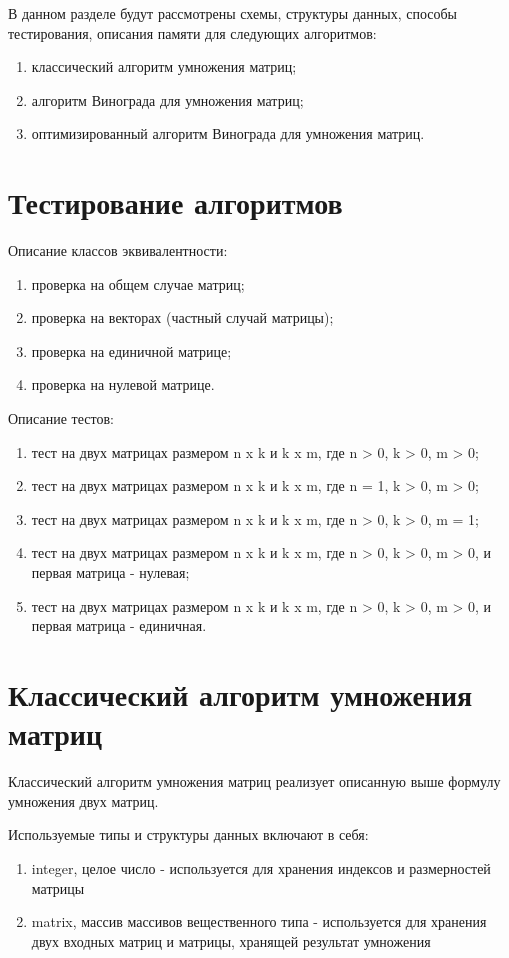 В данном разделе будут рассмотрены схемы, структуры данных, способы тестирования, описания памяти для следующих алгоритмов:
\begin{enumerate}
	\item классический алгоритм умножения матриц;
	\item алгоритм Винограда для умножения матриц;
	\item оптимизированный алгоритм Винограда для умножения матриц.
\end{enumerate}

\section{Тестирование алгоритмов}

Описание классов эквивалентности:
\begin{enumerate}
	\item проверка на общем случае матриц;
	\item проверка на векторах (частный случай матрицы);
	\item проверка на единичной матрице;
	\item проверка на нулевой матрице.
\end{enumerate}

Описание тестов:
\begin{enumerate}
	\item тест на двух матрицах размером n x k и k x m, где n > 0, k >  0, m > 0;
	\item тест на двух матрицах размером n x k и k x m, где n = 1, k >  0, m > 0;
	\item тест на двух матрицах размером n x k и k x m, где n > 0, k >  0, m = 1;
	\item тест на двух матрицах размером n x k и k x m, где n > 0, k >  0, m > 0, и первая матрица - нулевая;
	\item тест на двух матрицах размером n x k и k x m, где n > 0, k >  0, m > 0, и первая матрица - единичная.
\end{enumerate}

\section{Классический алгоритм умножения матриц}

Классический алгоритм умножения матриц реализует описанную выше формулу умножения двух матриц.

Используемые типы и структуры данных включают в себя:
\begin{enumerate}
	\item integer, целое число - используется для хранения индексов и размерностей матрицы
	\item matrix, массив массивов вещественного типа - используется для хранения двух входных матриц и матрицы, хранящей результат умножения
\end{enumerate}

